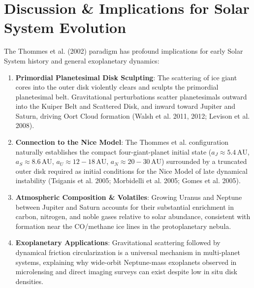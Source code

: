 \documentclass[11pt,a4paper]{article}
\begin{document}
\section{Discussion \& Implications for Solar System Evolution}
The Thommes et al. (2002) paradigm has profound implications for early Solar System history and general exoplanetary dynamics:
\begin{enumerate}
    \item \textbf{Primordial Planetesimal Disk Sculpting}: The scattering of ice giant cores into the outer disk violently clears and sculpts the primordial planetesimal belt. Gravitational perturbations scatter planetesimals outward into the Kuiper Belt and Scattered Disk, and inward toward Jupiter and Saturn, driving Oort Cloud formation (Walsh et al. 2011, 2012; Levison et al. 2008).
    \item \textbf{Connection to the Nice Model}: The Thommes et al. configuration naturally establishes the compact four-giant-planet initial state ($a_J \approx 5.4\,\text{AU}$, $a_S \approx 8.6\,\text{AU}$, $a_U \approx 12-18\,\text{AU}$, $a_N \approx 20-30\,\text{AU}$) surrounded by a truncated outer disk required as initial conditions for the Nice Model of late dynamical instability (Tsiganis et al. 2005; Morbidelli et al. 2005; Gomes et al. 2005).
    \item \textbf{Atmospheric Composition \& Volatiles}: Growing Uranus and Neptune between Jupiter and Saturn accounts for their substantial enrichment in carbon, nitrogen, and noble gases relative to solar abundance, consistent with formation near the CO/methane ice lines in the protoplanetary nebula.
    \item \textbf{Exoplanetary Applications}: Gravitational scattering followed by dynamical friction circularization is a universal mechanism in multi-planet systems, explaining why wide-orbit Neptune-mass exoplanets observed in microlensing and direct imaging surveys can exist despite low in situ disk densities.
\end{enumerate}
\end{document}
